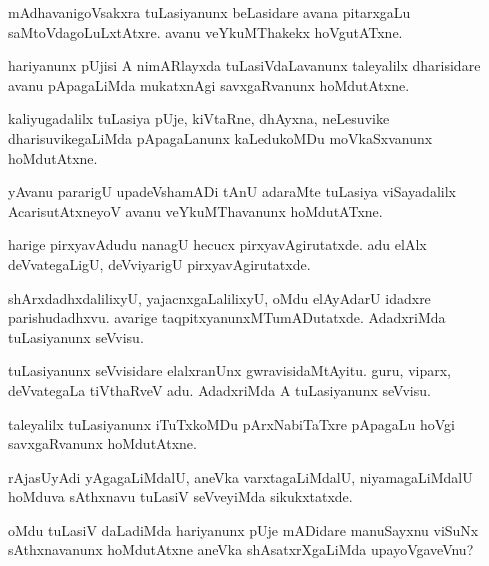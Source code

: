 \documentclass{article}
\begin{document}
\begin{mng}%
mAdhavanigoVsakxra tuLasiyanunx beLasidare avana pitarxgaLu 
saMtoVdagoLuLxtAtxre. avanu veYkuMThakekx hoVgutATxne. 
\end{mng}

\begin{mng}%
hariyanunx pUjisi A nimARlayxda tuLasiVdaLavanunx taleyalilx 
dharisidare avanu pApagaLiMda mukatxnAgi savxgaRvanunx hoMdutAtxne.
\end{mng}

\begin{mng}%
kaliyugadalilx tuLasiya pUje, kiVtaRne, dhAyxna, neLesuvike 
dharisuvikegaLiMda pApagaLanunx kaLedukoMDu moVkaSxvanunx hoMdutAtxne.
\end{mng}

\begin{mng}%
yAvanu pararigU upadeVshamADi tAnU adaraMte tuLasiya viSayadalilx 
AcarisutAtxneyoV avanu veYkuMThavanunx hoMdutATxne.
\end{mng}

\begin{mng}%
harige pirxyavAdudu nanagU hecucx pirxyavAgirutatxde. adu elAlx 
deVvategaLigU, deVviyarigU pirxyavAgirutatxde.
\end{mng}

\begin{mng}%
shArxdadhxdalilixyU, yajacnxgaLalilixyU, oMdu elAyAdarU idadxre 
parishudadhxvu. avarige taqpitxyanunxMTumADutatxde. AdadxriMda 
tuLasiyanunx seVvisu.
\end{mng}

\begin{mng}%
tuLasiyanunx seVvisidare elalxranUnx gwravisidaMtAyitu. guru, viparx, 
deVvategaLa tiVthaRveV adu. AdadxriMda A tuLasiyanunx seVvisu.
\end{mng}

\begin{mng}%
taleyalilx tuLasiyanunx iTuTxkoMDu pArxNabiTaTxre pApagaLu hoVgi 
savxgaRvanunx hoMdutAtxne.
\end{mng}

\begin{mng}%
rAjasUyAdi yAgagaLiMdalU, aneVka varxtagaLiMdalU, niyamagaLiMdalU 
hoMduva sAthxnavu tuLasiV seVveyiMda sikukxtatxde.
\end{mng}

\begin{mng}%
oMdu tuLasiV daLadiMda hariyanunx pUje mADidare manuSayxnu viSuNx 
sAthxnavanunx hoMdutAtxne aneVka shAsatxrXgaLiMda upayoVgaveVnu?
\end{mng}
\end{document}
